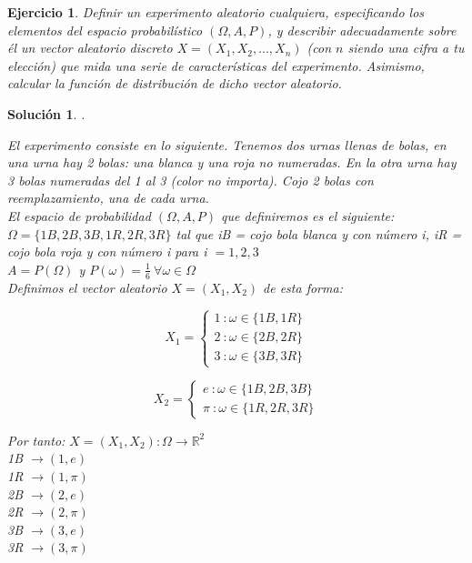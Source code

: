 \documentclass[11pt, a4paper]{article}
\newif\IfInSansMode
\newcommand{\R}{\mathbb{R}} \newcommand{\N}{\mathbb{N}}
\theoremstyle{theorem-style}
\theoremstyle{definition-style}
\newtheorem{ejer}{Ejercicio}[section]
\theoremstyle{remark-style}
\newtheorem*{sol}{Solución}
\theoremstyle{example-style}
\begin{document}
\begin{ejer}
Definir un experimento aleatorio cualquiera, especificando los elementos del espacio probabilístico $(\Omega,A,P)$,
y describir adecuadamente sobre él un vector aleatorio discreto $X = (X_1,X_2,...,X_n)$ (con $n$ siendo una
cifra a tu elección) que mida una serie de características del experimento. Asimismo, calcular la función de distribución de dicho vector aleatorio.
\end{ejer}

\begin{sol}.
	
	El experimento consiste en lo siguiente. Tenemos dos urnas llenas de bolas, en una urna hay 2 bolas: una blanca y una roja no numeradas. En la otra urna hay 3 bolas numeradas del 1 al 3 (color no importa). Cojo 2 bolas con reemplazamiento, una de cada urna. \\
	
	 El espacio de probabilidad $(\Omega,A,P)$ que definiremos es el siguiente: \\
	$\Omega = \{1B,2B,3B,1R,2R,3R\}$ tal que iB = cojo bola blanca y con número i, iR = cojo bola roja y con número i para i $ = 1,2,3$\\
	$A = P(\Omega)$ y $P(\omega) = \frac{1}{6} \ \forall \omega \in \Omega$ \\
	
	Definimos el vector aleatorio $X=(X_1,X_2)$ de esta forma:
	
	\begin{equation}
	X_1 = \left\lbrace
	\begin{array}{ll}
	1 \ : \omega \in \{1B,1R\} \\
	2 \ : \omega \in \{2B,2R\} \\
	3 \ : \omega \in \{3B,3R\}
	\end{array}
	\right.
	\end{equation}
	
	\begin{equation}
	X_2 = \left\lbrace
	\begin{array}{ll}
	e \ : \omega \in \{1B,2B,3B\} \\
	\pi \ : \omega \in \{1R,2R,3R\}
	\end{array}
	\right.
	\end{equation}
	
	Por tanto: $X = (X_1,X_2): \Omega \to \R^2$ \\
	1B $ \to (1,e)$ \\
	1R $ \to (1,\pi)$ \\
	2B $ \to (2,e)$ \\
	2R $ \to (2,\pi)$ \\
	3B $ \to (3,e)$ \\
	3R $ \to (3,\pi)$ \\
	

\end{sol}
\end{document}
